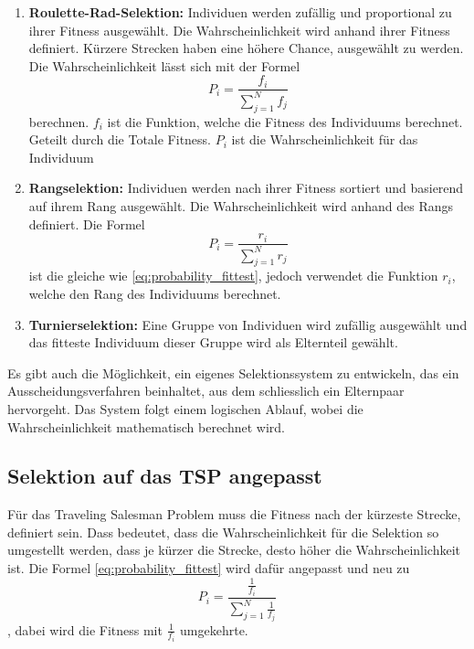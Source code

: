 \begin{enumerate}
    \item \textbf{Roulette-Rad-Selektion:} Individuen werden zufällig und
    proportional zu ihrer Fitness ausgewählt. Die Wahrscheinlichkeit wird 
    anhand ihrer Fitness definiert. Kürzere Strecken haben eine höhere Chance, 
    ausgewählt zu werden. Die Wahrscheinlichkeit lässt sich mit der Formel
    \begin{equation}
        P_i
        =
        \frac{f_i}{\sum_{j=1}^{N} f_j}
        \label{eq:probability_fittest}
    \end{equation}
    berechnen. \(f_i\) ist die Funktion, welche die Fitness des Individuums berechnet.
    Geteilt durch die Totale Fitness. \(P_i\) ist die Wahrscheinlichkeit für das Individuum
    \item \textbf{Rangselektion:} Individuen werden nach ihrer Fitness sortiert und basierend
    auf ihrem Rang ausgewählt. Die Wahrscheinlichkeit wird anhand des Rangs definiert. Die 
    Formel 
    \begin{equation}
        P_i
        =
        \frac{r_i}{\sum_{j=1}^{N} r_j}
        \label{eq:probability_rating}
    \end{equation}
    ist die gleiche wie \eqref{eq:probability_fittest}, jedoch verwendet die Funktion \(r_i\), welche den 
    Rang des Individuums berechnet.
    \item \textbf{Turnierselektion:} Eine Gruppe von Individuen wird zufällig ausgewählt
    und das fitteste Individuum dieser Gruppe wird als Elternteil gewählt.
\end{enumerate}
Es gibt auch die Möglichkeit, ein eigenes Selektionssystem zu entwickeln, 
das ein Ausscheidungsverfahren beinhaltet, aus dem schliesslich ein 
Elternpaar hervorgeht. Das System folgt einem logischen Ablauf, wobei 
die Wahrscheinlichkeit mathematisch berechnet wird.

\subsection{Selektion auf das TSP angepasst
\label{buch:paper:varalg:subsection:selection_tsp}}
Für das Traveling Salesman Problem muss die Fitness nach der kürzeste Strecke,
definiert sein. Dass bedeutet, dass die Wahrscheinlichkeit für die Selektion
so umgestellt werden, dass je kürzer die Strecke, desto höher die Wahrscheinlichkeit
ist. Die Formel \eqref{eq:probability_fittest} wird dafür angepasst und neu zu
\begin{equation}
    P_i
    =
    \frac{\frac{1}{f_i}}{\sum_{j=1}^{N} \frac{1}{f_j}}
    \label{buch:paper:varalg:selection:probability_fittest_tsp}
\end{equation}
, dabei wird die Fitness mit \(\frac{1}{f_i}\) umgekehrte.
